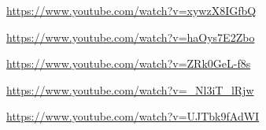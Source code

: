 
\begin{intersong}\url{https://www.youtube.com/watch?v=xywzX8IGfbQ}\end{intersong}
\begin{intersong}\url{https://www.youtube.com/watch?v=haOys7E2Zbo}\end{intersong}
\begin{intersong}\url{https://www.youtube.com/watch?v=ZRk0GeL-f8s}\end{intersong}
\begin{intersong}\url{https://www.youtube.com/watch?v=_Nl3iT_lRjw}\end{intersong}
\begin{intersong}\url{https://www.youtube.com/watch?v=UJTbk9fAdWI}\end{intersong}
